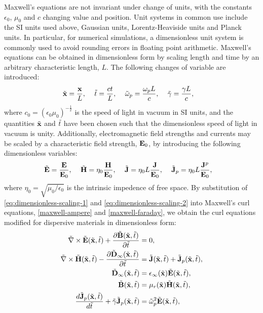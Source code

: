 Maxwell's equations are not invariant under change of units, with the constants $\epsilon_0$, $\mu_0$ and $c$ changing value and position. Unit systems in common use include the SI units used above, Gaussian units, Lorentz-Heaviside units and Planck units.
In particular, for numerical simulations, a dimensionless unit system is commonly used to avoid rounding errors in floating point arithmetic. Maxwell's equations can be obtained in dimensionless form by scaling length and time by an arbitrary characteristic length, $L$. The following changes of variable are introduced:
    \begin{align}
        \label{eq:dimensionless-scaling-1}
        \tilde{\mathbf{x}} &= \frac{\mathbf{x}}{L}, &  \
        \tilde{t} &= \frac{ct}{L}, &  \
        \tilde{\omega}_p &= \frac{\omega_p L}{c}, & \
        \tilde{\gamma} &= \frac{\gamma L}{c},
    \end{align}
where $c_0 = ( \epsilon_0 \mu_0 )^{-\frac{1}{2}}$ is the speed of light in vacuum in SI units, and the quantities $\tilde{\mathbf{x}}$ and $\tilde{t}$ have been chosen such that the dimensionless speed of light in vacuum is unity. Additionally, electromagnetic field strengths and currents may be scaled by a characteristic field strength, $\mathbf{E}_0$, by introducing the following dimensionless variables:
    \begin{align}
        \label{eq:dimensionless-scaling-2}
        \tilde{\mathbf{E}} &= \frac{\mathbf{E}}{\mathbf{E}_0}, &  \
        \tilde{\mathbf{H}} &= \eta_0 \frac{\mathbf{H}}{\mathbf{E}_0}, &  \
        \tilde{\mathbf{J}} &= \eta_0 L \frac{\mathbf{J}}{\mathbf{E}_0}, & \
        \tilde{\mathbf{J}}_p &= \eta_0 L \frac{\mathbf{J}^p}{\mathbf{E}_0},
    \end{align}
    where $\eta_0 = \sqrt{\mu_0 / \epsilon_0}$ is the intrinsic impedence of free space. By substitution of \eqref{eq:dimensionless-scaling-1} and \eqref{eq:dimensionless-scaling-2} into Maxwell's curl equations, \eqref{maxwell-ampere} and \eqref{maxwell-faraday}, we obtain the curl equations modified for dispersive materials in dimensionless form:
\begin{subequations}
    \label{eq:dimensionless-maxwell}
    \begin{align}
        \tilde{\nabla} \times \tilde{\mathbf{E}}(\tilde{\mathbf{x}},\tilde{t}) + \frac{\partial\tilde{\mathbf{B}}(\tilde{\mathbf{x}}, \tilde{t}) }{\partial \tilde{t}} &= 0, \\
        \tilde{\nabla} \times \tilde{\mathbf{H}}(\tilde{\mathbf{x}},\tilde{t}) - \frac{\partial \tilde{\mathbf{D}}_{\infty}(\tilde{\mathbf{x}}, \tilde{t}) }{\partial \tilde{t}} &= \tilde{\mathbf{J}}(\tilde{\mathbf{x}},\tilde{t}) + \tilde{\mathbf{J}}_p(\tilde{\mathbf{x}},\tilde{t}), \\
        \tilde{\mathbf{D}}_{\infty}(\tilde{\mathbf{x}},\tilde{t}) &= \epsilon_{\infty}(\tilde{\mathbf{x}}) \tilde{\mathbf{E}}(\tilde{\mathbf{x}},\tilde{t}), \\
        \tilde{\mathbf{B}}(\tilde{\mathbf{x}},\tilde{t}) &= \mu_r(\tilde{\mathbf{x}}) \tilde{\mathbf{H}}(\tilde{\mathbf{x}},\tilde{t}), \\
        \frac{d \tilde{\mathbf{J}}_p(\tilde{\mathbf{x}},\tilde{t})}{d\tilde{t}} + \tilde{\gamma} \tilde{\mathbf{J}}_p(\tilde{\mathbf{x}},\tilde{t}) &= \tilde{\omega}_p^2 \tilde{\mathbf{E}}(\tilde{\mathbf{x}},\tilde{t}),
    \end{align}
\end{subequations}
